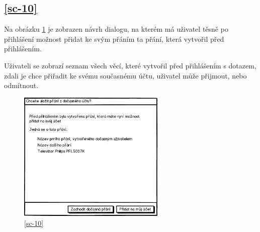 \subsection{\ref{sc-10}}
Na obrázku \ref{fig:dialog-pridani-docasnych-prani} je zobrazen návrh dialogu, na kterém má uživatel těsně po přihlášení možnost přidat ke svým přáním ta přání, která vytvořil před přihlášením.

Uživateli se zobrazí seznam všech věcí, které vytvořil před přihlášením s dotazem, zdali je chce přiřadit ke svému současnému účtu, uživatel může přijmout, nebo odmítnout.

\begin{figure}[htb]
\begin{center}
\includegraphics[width=70mm]{./pictures/mock/dialog-pridani-docasnych-prani.png}
\caption{\ref{sc-10}}
\label{fig:dialog-pridani-docasnych-prani}
\end{center}
\end{figure}